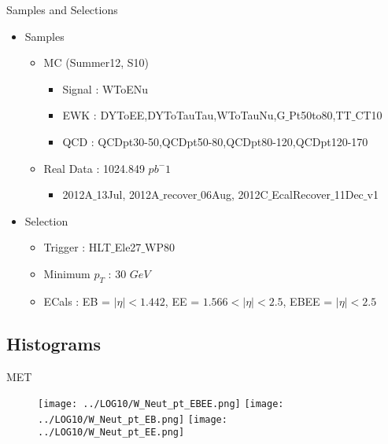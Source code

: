 \documentclass[xcolor=x11names,compress]{beamer}
\renewcommand{\(}{\begin{columns}}
\renewcommand{\)}{\end{columns}}
\newcommand{\<}[1]{\begin{column}{#1}}
\renewcommand{\>}{\end{column}}
\begin{document}
\begin{frame}{Samples and Selections}

  \begin{itemize}
  \item Samples
    \begin{itemize}
    \item MC (Summer12, S10)
      \begin{itemize}
      \item Signal : WToENu
      \item EWK : DYToEE,DYToTauTau,WToTauNu,G$\_$Pt50to80,TT$\_$CT10
      \item QCD : QCDpt30-50,QCDpt50-80,QCDpt80-120,QCDpt120-170
      \end{itemize}
    \item Real Data : 1024.849 $pb^-1$
      \begin{itemize}
      \item 2012A$\_$13Jul, 2012A$\_$recover$\_$06Aug, 2012C$\_$EcalRecover$\_$11Dec$\_$v1
      \end{itemize}
    \end{itemize}
   
  \item Selection
    \begin{itemize}
    \item Trigger : HLT$\_$Ele27$\_$WP80
    \item Minimum $p_{T}$ : 30 $GeV$
    \item ECals : EB = $|\eta|<1.442$, EE = $1.566<|\eta| <2.5$, EBEE = $|\eta| < 2.5$
    \end{itemize}
  \end{itemize}
  
  
\end{frame}


\subsection{Histograms}
\begin{frame}{MET}

  \begin{figure}[ht!]
    \centering
    \scalebox{0.13}
    {
      \texttt{[image: ../LOG10/W\_Neut\_pt\_EBEE.png]}
      \texttt{[image: ../LOG10/W\_Neut\_pt\_EB.png]}
      \texttt{[image: ../LOG10/W\_Neut\_pt\_EE.png]}
    }
  \end{figure}
  
\end{frame}
\end{document}
